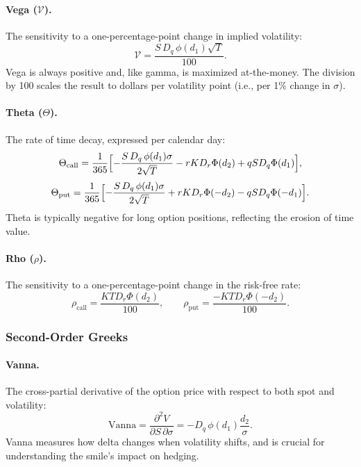 \documentclass[11pt,a4paper]{article}
\begin{document}
\paragraph{Vega ($\mathcal{V}$).}
The sensitivity to a one-percentage-point change in implied volatility:
\begin{equation}\label{eq:vega}
    \mathcal{V} = \frac{S \, D_q \, \phi(d_1) \sqrt{T}}{100}.
\end{equation}
Vega is always positive and, like gamma, is maximized at-the-money. The division by 100 scales the result to dollars per volatility point (i.e., per 1\% change in $\sigma$).

\paragraph{Theta ($\Theta$).}
The rate of time decay, expressed per calendar day:
\begin{equation}\label{eq:theta_call}
    \Theta_{\text{call}} = \frac{1}{365} \Bigl[
        -\frac{S \, D_q \, \phi(d_1) \sigma}{2\sqrt{T}}
        - r K D_r \Phi(d_2)
        + q S D_q \Phi(d_1)
    \Bigr],
\end{equation}
\begin{equation}\label{eq:theta_put}
    \Theta_{\text{put}} = \frac{1}{365} \Bigl[
        -\frac{S \, D_q \, \phi(d_1) \sigma}{2\sqrt{T}}
        + r K D_r \Phi(-d_2)
        - q S D_q \Phi(-d_1)
    \Bigr].
\end{equation}
Theta is typically negative for long option positions, reflecting the erosion of time value.

\paragraph{Rho ($\rho$).}
The sensitivity to a one-percentage-point change in the risk-free rate:
\begin{equation}\label{eq:rho}
    \rho_{\text{call}} = \frac{K T D_r \Phi(d_2)}{100}, \qquad
    \rho_{\text{put}} = \frac{-K T D_r \Phi(-d_2)}{100}.
\end{equation}

\subsubsection{Second-Order Greeks}

\paragraph{Vanna.}
The cross-partial derivative of the option price with respect to both spot and volatility:
\begin{equation}\label{eq:vanna}
    \text{Vanna} = \frac{\partial^2 V}{\partial S \, \partial \sigma} = -D_q \, \phi(d_1) \frac{d_2}{\sigma}.
\end{equation}
Vanna measures how delta changes when volatility shifts, and is crucial for understanding the smile's impact on hedging.
\end{document}
